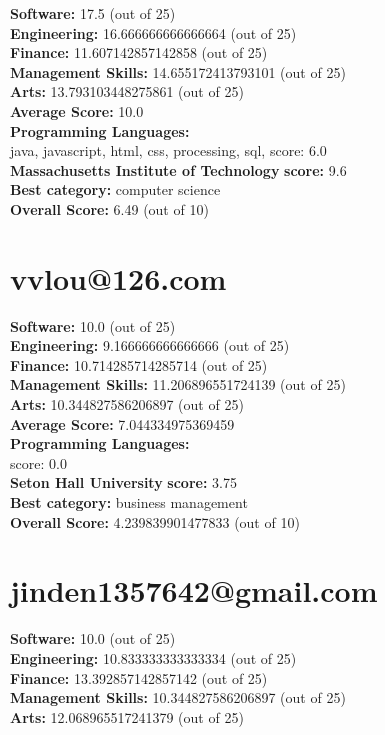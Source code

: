 \documentclass{article}
\begin{document}
\textbf{Software:} 17.5 (out of 25)\\
\textbf{Engineering: } 16.666666666666664 (out of 25)\\
\textbf{Finance:} 11.607142857142858 (out of 25)\\
\textbf{Management Skills:} 14.655172413793101 (out of 25)\\
\textbf{Arts:} 13.793103448275861 (out of 25)\\
\textbf{Average Score: } 10.0\\
\textbf{Programming Languages:} \\
java, javascript, html, css, processing, sql, score: 6.0\\
\textbf{Massachusetts Institute of Technology} \textbf{score:} 9.6\\
\textbf{Best category: } computer science\\
\textbf{Overall Score: }6.49 (out of 10)\section{vvlou@126.com}
\textbf{Software:} 10.0 (out of 25)\\
\textbf{Engineering: } 9.166666666666666 (out of 25)\\
\textbf{Finance:} 10.714285714285714 (out of 25)\\
\textbf{Management Skills:} 11.206896551724139 (out of 25)\\
\textbf{Arts:} 10.344827586206897 (out of 25)\\
\textbf{Average Score: } 7.044334975369459\\
\textbf{Programming Languages:} \\
score: 0.0\\
\textbf{Seton Hall University} \textbf{score:} 3.75\\
\textbf{Best category: } business management\\
\textbf{Overall Score: }4.239839901477833 (out of 10)\section{jinden1357642@gmail.com}
\textbf{Software:} 10.0 (out of 25)\\
\textbf{Engineering: } 10.833333333333334 (out of 25)\\
\textbf{Finance:} 13.392857142857142 (out of 25)\\
\textbf{Management Skills:} 10.344827586206897 (out of 25)\\
\textbf{Arts:} 12.068965517241379 (out of 25)\\
\end{document}
